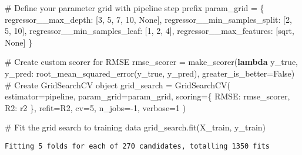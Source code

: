 \documentclass[
  letterpaper,
  DIV=11,
  numbers=noendperiod]{scrreprt}
\newenvironment{Shaded}{\begin{snugshade}}{\end{snugshade}}
\newcommand{\CommentTok}[1]{\textcolor[rgb]{0.37,0.37,0.37}{#1}}
\newcommand{\DecValTok}[1]{\textcolor[rgb]{0.68,0.00,0.00}{#1}}
\newcommand{\KeywordTok}[1]{\textcolor[rgb]{0.00,0.23,0.31}{\textbf{#1}}}
\newcommand{\NormalTok}[1]{\textcolor[rgb]{0.00,0.23,0.31}{#1}}
\newcommand{\OperatorTok}[1]{\textcolor[rgb]{0.37,0.37,0.37}{#1}}
\newcommand{\StringTok}[1]{\textcolor[rgb]{0.13,0.47,0.30}{#1}}
\newcommand{\VariableTok}[1]{\textcolor[rgb]{0.07,0.07,0.07}{#1}}
\begin{document}
\begin{Shaded}
\begin{Highlighting}[]
\CommentTok{\# Define your parameter grid with pipeline step prefix}
\NormalTok{param\_grid }\OperatorTok{=}\NormalTok{ \{}
    \StringTok{\textquotesingle{}regressor\_\_max\_depth\textquotesingle{}}\NormalTok{: [}\DecValTok{3}\NormalTok{, }\DecValTok{5}\NormalTok{, }\DecValTok{7}\NormalTok{, }\DecValTok{10}\NormalTok{, }\VariableTok{None}\NormalTok{],}
    \StringTok{\textquotesingle{}regressor\_\_min\_samples\_split\textquotesingle{}}\NormalTok{: [}\DecValTok{2}\NormalTok{, }\DecValTok{5}\NormalTok{, }\DecValTok{10}\NormalTok{],}
    \StringTok{\textquotesingle{}regressor\_\_min\_samples\_leaf\textquotesingle{}}\NormalTok{: [}\DecValTok{1}\NormalTok{, }\DecValTok{2}\NormalTok{, }\DecValTok{4}\NormalTok{],}
    \StringTok{\textquotesingle{}regressor\_\_max\_features\textquotesingle{}}\NormalTok{: [}\StringTok{\textquotesingle{}sqrt\textquotesingle{}}\NormalTok{, }\VariableTok{None}\NormalTok{]}
\NormalTok{\}}

\CommentTok{\# Create custom scorer for RMSE}
\NormalTok{rmse\_scorer }\OperatorTok{=}\NormalTok{ make\_scorer(}\KeywordTok{lambda}\NormalTok{ y\_true, y\_pred: root\_mean\_squared\_error(y\_true, y\_pred),}
\NormalTok{                          greater\_is\_better}\OperatorTok{=}\VariableTok{False}\NormalTok{)}
\CommentTok{\# Create GridSearchCV object}
\NormalTok{grid\_search }\OperatorTok{=}\NormalTok{ GridSearchCV(}
\NormalTok{    estimator}\OperatorTok{=}\NormalTok{pipeline,}
\NormalTok{    param\_grid}\OperatorTok{=}\NormalTok{param\_grid,}
\NormalTok{    scoring}\OperatorTok{=}\NormalTok{\{}
        \StringTok{\textquotesingle{}RMSE\textquotesingle{}}\NormalTok{: rmse\_scorer,}
        \StringTok{\textquotesingle{}R2\textquotesingle{}}\NormalTok{: }\StringTok{\textquotesingle{}r2\textquotesingle{}}
\NormalTok{    \},}
\NormalTok{    refit}\OperatorTok{=}\StringTok{\textquotesingle{}R2\textquotesingle{}}\NormalTok{,}
\NormalTok{    cv}\OperatorTok{=}\DecValTok{5}\NormalTok{,}
\NormalTok{    n\_jobs}\OperatorTok{={-}}\DecValTok{1}\NormalTok{,}
\NormalTok{    verbose}\OperatorTok{=}\DecValTok{1}
\NormalTok{)}

\CommentTok{\# Fit the grid search to training data}
\NormalTok{grid\_search.fit(X\_train, y\_train)}
\end{Highlighting}
\end{Shaded}

\begin{verbatim}
Fitting 5 folds for each of 270 candidates, totalling 1350 fits
\end{verbatim}
\end{document}
